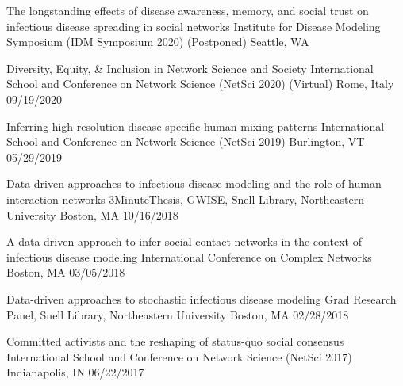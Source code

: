 \begin{cventries}

  \cvpresentation
    {The longstanding effects of disease awareness, memory, and social trust on infectious disease spreading in social networks} %
    {Institute for Disease Modeling Symposium (IDM Symposium 2020)} %
    {(Postponed) Seattle, WA} %
    {} %


  \cvpresentation
    {Diversity, Equity, \& Inclusion in Network Science and Society} %
    {International School and Conference on Network Science (NetSci 2020)} %
    {(Virtual) Rome, Italy} %
    {09/19/2020} %


  \cvpresentation
    {Inferring high-resolution disease specific human mixing patterns} %
    {International School and Conference on Network Science (NetSci 2019)} %
    {Burlington, VT} %
    {05/29/2019} %


  \cvpresentation
    {Data-driven approaches to infectious disease modeling and the role of human interaction networks} %
    {3MinuteThesis, GWISE, Snell Library, Northeastern University} %
    {Boston, MA} %
    {10/16/2018} %
    
  \cvpresentation
    {A data-driven approach to infer social contact networks in the context of infectious disease modeling} %
    {International Conference on Complex Networks} %
    {Boston, MA} %
    {03/05/2018} %

  \cvpresentation
    {Data-driven approaches to stochastic infectious disease modeling
} %
    {Grad Research Panel, Snell Library, Northeastern University} %
    {Boston, MA} %
    {02/28/2018} %

  \cvpresentation
    {Committed activists and the reshaping of status-quo social consensus} %
    {International School and Conference on Network Science (NetSci 2017)} %
    {Indianapolis, IN} %
    {06/22/2017} %
    
\end{cventries}

